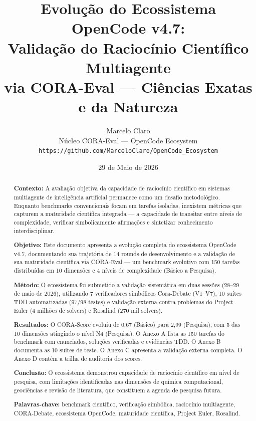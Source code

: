 \documentclass[12pt,a4paper,oneside]{article}
\title{\textbf{Evolução do Ecossistema OpenCode v4.7:}\\
       \large Validação do Raciocínio Científico Multiagente\\
       \normalsize via CORA-Eval — Ciências Exatas e da Natureza}
\author{Marcelo Claro\\[2pt]
        \small Núcleo CORA-Eval — OpenCode Ecosystem\\
        \small \texttt{https://github.com/MarceloClaro/OpenCode\_Ecosystem}}
\date{29 de Maio de 2026}
\begin{document}
\maketitle

\begin{abstract}
\noindent\textbf{Contexto:} A avaliação objetiva da capacidade de raciocínio
científico em sistemas multiagente de inteligência artificial permanece como
um desafio metodológico. Enquanto benchmarks convencionais focam em tarefas
isoladas, inexistem métricas que capturem a maturidade científica integrada
— a capacidade de transitar entre níveis de complexidade, verificar
simbolicamente afirmações e sintetizar conhecimento interdisciplinar.

\textbf{Objetivo:} Este documento apresenta a evolução completa do ecossistema
OpenCode v4.7, documentando sua trajetória de 14 rounds de desenvolvimento e
a validação de sua maturidade científica via CORA-Eval — um benchmark
evolutivo com 150 tarefas distribuídas em 10 dimensões e 4 níveis de
complexidade (Básico a Pesquisa).

\textbf{Método:} O ecossistema foi submetido a validação sistemática em duas
sessões (28–29 de maio de 2026), utilizando 7 verificadores simbólicos
Cora-Debate (V1–V7), 10 suítes TDD automatizadas (97/98 testes) e validação
externa contra problemas do Project Euler (4 milhões de solvers) e Rosalind
(270 mil solvers).

\textbf{Resultados:} O CORA-Score evoluiu de 0,67 (Básico) para 2,99
(Pesquisa), com 5 das 10 dimensões atingindo o nível N4 (Pesquisa). O Anexo A
lista as 150 tarefas do benchmark com enunciados, soluções verificadas e
evidências TDD. O Anexo B documenta as 10 suítes de teste. O Anexo C apresenta
a validação externa completa. O Anexo D contém a trilha de auditoria dos scores.

\textbf{Conclusão:} O ecossistema demonstrou capacidade de raciocínio
científico em nível de pesquisa, com limitações identificadas nas dimensões
de química computacional, geociências e revisão de literatura, que constituem
a agenda de pesquisa futura.

\vspace{6pt}
\noindent\textbf{Palavras-chave:} benchmark científico, verificação simbólica,
raciocínio multiagente, CORA-Debate, ecossistema OpenCode, maturidade
científica, Project Euler, Rosalind.
\end{abstract}
\end{document}
